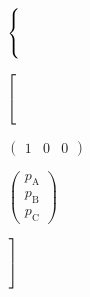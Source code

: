 \documentclass[a4paper,11pt,twoside,openright]{book}
\def\lthtmlcheckvsize{\ifdim\ht\sizebox<\vsize 
  \ifdim\wd\sizebox<\hsize\expandafter\hfill\fi \expandafter\vfill
  \else\expandafter\vss\fi}%
\begin{document}
{\newpage\clearpage
{}%
$\displaystyle \left\{\vphantom{ Re \left[ \frac{0.5}{p_{\textrm{A}}}
\begin{pmatrix}1&0&0\end{pmatrix} \cdot \left( \mathbf{AB} + \mathbf{CD} \right) \cdot \begin{pmatrix}p_{\textrm{A}}\\ p_{\textrm{B}}\\ p_{\textrm{C}}\end{pmatrix}
\right] }\right.$%
\lthtmlindisplaymathZ
\lthtmlcheckvsize\clearpage}

{\newpage\clearpage
{}%
$\displaystyle \left[\vphantom{ \frac{0.5}{p_{\textrm{A}}}
\begin{pmatrix}1&0&0\end{pmatrix} \cdot \left( \mathbf{AB} + \mathbf{CD} \right) \cdot \begin{pmatrix}p_{\textrm{A}}\\ p_{\textrm{B}}\\ p_{\textrm{C}}\end{pmatrix}
}\right.$%
\lthtmlindisplaymathZ
\lthtmlcheckvsize\clearpage}

{\newpage\clearpage
{}%
$\displaystyle \begin{pmatrix}1&0&0\end{pmatrix}$%
\lthtmlindisplaymathZ
\lthtmlcheckvsize\clearpage}

{\newpage\clearpage
{}%
$\displaystyle \begin{pmatrix}p_{\textrm{A}}\\ p_{\textrm{B}}\\ p_{\textrm{C}}\end{pmatrix}$%
\lthtmlindisplaymathZ
\lthtmlcheckvsize\clearpage}

{\newpage\clearpage
{}%
$\displaystyle \left.\vphantom{ \frac{0.5}{p_{\textrm{A}}}
\begin{pmatrix}1&0&0\end{pmatrix} \cdot \left( \mathbf{AB} + \mathbf{CD} \right) \cdot \begin{pmatrix}p_{\textrm{A}}\\ p_{\textrm{B}}\\ p_{\textrm{C}}\end{pmatrix}
}\right]$%
\lthtmlindisplaymathZ
\lthtmlcheckvsize\clearpage}
\end{document}
